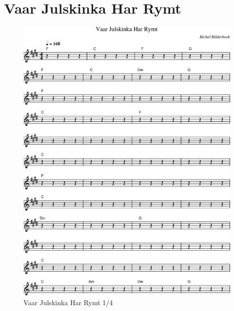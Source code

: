\chapter{Vaar Julskinka Har Rymt}

%

\begin{figure}[!htbp]
  \includegraphics[width=\textwidth,height=\textheight,keepaspectratio]{../songs/xx_vaar_julskinka_har_rymt-0.png}
  \caption{Vaar Julskinka Har Rymt 1/4}
  \label{fig:xx_vaar_julskinka_har_rymt_1}
\end{figure}

